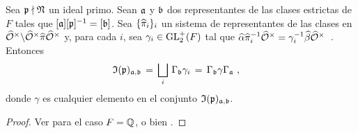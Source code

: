 \begin{propoDescomposicionInduceDescomposicion}%
	\label{propo:descomposicioninducedescomposicion}
	Sea $\frak{p}\nmid\frak{N}$ un ideal primo. Sean $\frak{a}$ y
	$\frak{b}$ dos representantes de las clases estrictas de $F$ tales que
	$[\frak{a}][\frak{p}]^{-1}=[\frak{b}]$. Sea $\{\hhat{\pi}_{i}\}_{i}$
	un sistema de representantes de las clases en
	\begin{math}
		\Idfin{\cal{O}}\backslash
			\Idfin{\cal{O}}\hhat{\pi}\Idfin{\cal{O}}
	\end{math}
	y, para cada $i$, sea $\gamma_{i}\in\GLtp_{2}(F)$ tal que
	\begin{math}
		\hhat{\alpha}\hhat{\pi}_{i}^{-1}\Idfin{\cal{O}}=
			\gamma_{i}^{-1}\hhat{\beta}\Idfin{\cal{O}}
	\end{math}~.
	Entonces
	\begin{align*}
		\frak{I}(\frak{p})_{\frak{a},\frak{b}} & \,=\,
			\bigsqcup_{i}\,\Gamma_{\frak{b}}\gamma_{i} \,=\,
			\Gamma_{\frak{b}}\gamma\Gamma_{\frak{a}}
		\text{ ,}
	\end{align*}
	donde $\gamma$ es cualquier elemento en el conjunto
	$\frak{I}(\frak{p})_{\frak{a},\frak{b}}$.
\end{propoDescomposicionInduceDescomposicion}

\begin{proof}
	Ver \cite[Thm.~5.3.5]{MiyakeModular} para el caso $F=\bb{Q}$,
	o bien \cite[Propo.~2.3]{ShimuraDirichletSeriesAbelianVarieties}.
\end{proof}

